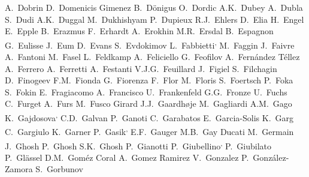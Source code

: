 \begin{flushleft}
A.~Dobrin\And 
D.~Domenicis Gimenez\And 
B.~D\"{o}nigus\And 
O.~Dordic\And 
A.K.~Dubey\And 
A.~Dubla\And 
S.~Dudi\And 
A.K.~Duggal\And 
M.~Dukhishyam\And 
P.~Dupieux\And 
R.J.~Ehlers\And 
D.~Elia\And 
H.~Engel\And 
E.~Epple\And 
B.~Erazmus\And 
F.~Erhardt\And 
A.~Erokhin\And 
M.R.~Ersdal\And 
B.~Espagnon\And 
G.~Eulisse\And 
J.~Eum\And 
D.~Evans\And 
S.~Evdokimov\And 
L.~Fabbietti\textsuperscript{,}\And 
M.~Faggin\And 
J.~Faivre\And 
A.~Fantoni\And 
M.~Fasel\And 
L.~Feldkamp\And 
A.~Feliciello\And 
G.~Feofilov\And 
A.~Fern\'{a}ndez T\'{e}llez\And 
A.~Ferrero\And 
A.~Ferretti\And 
A.~Festanti\And 
V.J.G.~Feuillard\And 
J.~Figiel\And 
S.~Filchagin\And 
D.~Finogeev\And 
F.M.~Fionda\And 
G.~Fiorenza\And 
F.~Flor\And 
M.~Floris\And 
S.~Foertsch\And 
P.~Foka\And 
S.~Fokin\And 
E.~Fragiacomo\And 
A.~Francisco\And 
U.~Frankenfeld\And 
G.G.~Fronze\And 
U.~Fuchs\And 
C.~Furget\And 
A.~Furs\And 
M.~Fusco Girard\And 
J.J.~Gaardh{\o}je\And 
M.~Gagliardi\And 
A.M.~Gago\And 
K.~Gajdosova\textsuperscript{,}\And 
C.D.~Galvan\And 
P.~Ganoti\And 
C.~Garabatos\And 
E.~Garcia-Solis\And 
K.~Garg\And 
C.~Gargiulo\And 
K.~Garner\And 
P.~Gasik\textsuperscript{,}\And 
E.F.~Gauger\And 
M.B.~Gay Ducati\And 
M.~Germain\And 
J.~Ghosh\And 
P.~Ghosh\And 
S.K.~Ghosh\And 
P.~Gianotti\And 
P.~Giubellino\textsuperscript{,}\And 
P.~Giubilato\And 
P.~Gl\"{a}ssel\And 
D.M.~Gom\'{e}z Coral\And 
A.~Gomez Ramirez\And 
V.~Gonzalez\And 
P.~Gonz\'{a}lez-Zamora\And 
S.~Gorbunov\And 

\end{flushleft}
